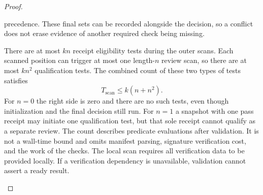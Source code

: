 \begin{proof}
\begin{enumerate}
\begin{enumerate}
precedence. These final sets can be recorded alongside
the decision, so a conflict does not erase evidence of
another required check being missing.
\end{enumerate}
There are at most $kn$ receipt eligibility tests during the
outer scans.
Each scanned position can trigger at most one length-$n$
review scan, so there are at most $kn^2$ qualification tests.
The combined count of these two types of tests satisfies
\begin{equation}
\label{eq:offline-ci-tests}
T_{\mathrm{scan}}\le k(n+n^2).
\end{equation}
For $n=0$ the right side is zero and there are no such tests,
even though initialization and the final decision still run.
For $n=1$ a snapshot with one pass receipt may initiate
one qualification test, but that sole receipt cannot qualify
as a separate review.
The count describes predicate evaluations after validation.
It is not a wall-time bound and omits manifest parsing,
signature verification cost, and the work of the checks.
The local scan requires all verification data to be provided
locally. If a verification dependency is unavailable,
validation cannot assert a ready result.


\end{enumerate}
\end{proof}
